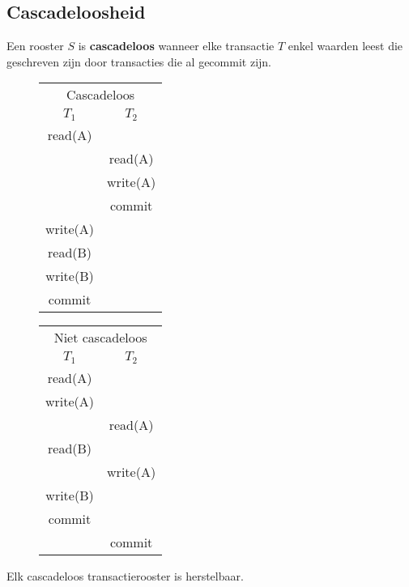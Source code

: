 \documentclass[transacties.tex]{subfiles}
\begin{document}
\subsection{Cascadeloosheid}
\begin{de}
Een rooster $S$ is \textbf{cascadeloos} wanneer elke transactie $T$ enkel waarden leest die geschreven zijn door transacties die al gecommit zijn.
\end{de}
\begin{figure}[H]
\centering
\begin{tabular}{c|c}
\multicolumn{2}{c}{Cascadeloos}\\
$T_1$&$T_2$\\
\hline
read(A) &\\
& read(A)\\
&write(A)\\
&commit\\
write(A)&\\
read(B)&\\
write(B)&\\
commit&
\end{tabular}
\begin{tabular}{c|c}
\multicolumn{2}{c}{Niet cascadeloos}\\
$T_1$&$T_2$\\
\hline
read(A) &\\
write(A)&\\
& read(A)\\
read(B)&\\
&write(A)\\
write(B)&\\
commit&\\
&commit\\
\end{tabular}
\end{figure}
\begin{ei}
Elk cascadeloos transactierooster is herstelbaar.
\end{ei}
\end{document}
